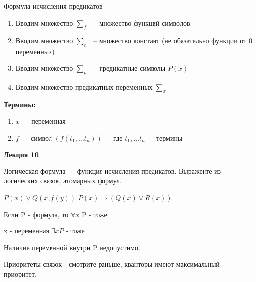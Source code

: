 \documentclass[russian]{lecture-notes}
\begin{document}
    \begin{definition}
        Формула исчисления предикатов

        \begin{enumerate}
            \item{
                Вводим множество $\sum_f$ ~-- множество функций символов
            }
            \item{
                Вводим множество $\sum_c$ ~-- множество констант (не обязательно функции от 0 переменных)
            }
            \item{
                Вводим множество $\sum_p$ ~-- предикатные символы $P(x)$
            }
            \item{
                Вводим множество предикатных переменных $\sum_x$
            }
        \end{enumerate}

        \textbf{Термины:}

        \begin{enumerate}
            \item $x$ ~-- переменная
            \item{
                $f$ ~-- символ $(f(t_1, \dots t_n))$ ~-- где $t_1, \dots t_n$ ~-- термины
            }
        \end{enumerate}
    \end{definition}

    \textbf{Лекция 10}

    \begin{definition}

        Логическая формула ~-- функция исчисления предикатов. Выраженте из логических связок, атомарных формул.

        \end{definition}


    $P(x) \lor Q(x,f(y))$ \qquad $P(x) \Rightarrow (Q(x) \lor R(x))$

    Если P - формула, то $\forall x$ P - тоже

    x - переменная $\exists x P$ - тоже

    Наличие переменной внутри P недопустимо.

    \begin{remark}

        Приоритеты связок - смотрите раньше, кванторы имеют максимальный приоритет.

        \end{remark}
\end{document}
